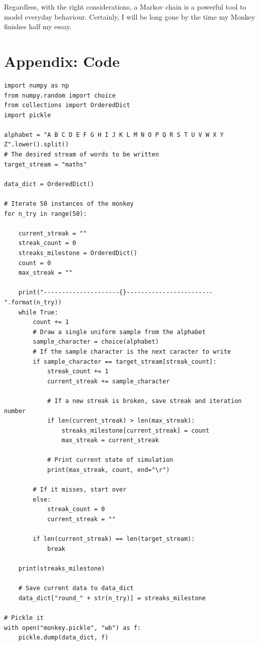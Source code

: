 \documentclass{article}
\begin{document}
Regardless, with the right considerations, a Markov chain is a powerful tool to model everyday behaviour. Certainly, I will be long gone by the time my Monkey finishes half my essay.

\newpage
\section{Appendix: Code}

\begin{Verbatim}[fontsize=\footnotesize]
import numpy as np
from numpy.random import choice
from collections import OrderedDict
import pickle

alphabet = "A B C D E F G H I J K L M N O P Q R S T U V W X Y Z".lower().split()
# The desired stream of words to be written
target_stream = "maths"

data_dict = OrderedDict()

# Iterate 50 instances of the monkey
for n_try in range(50):

    current_streak = ""
    streak_count = 0
    streaks_milestone = OrderedDict()
    count = 0
    max_streak = ""

    print("---------------------{}------------------------".format(n_try))
    while True:
        count += 1
        # Draw a single uniform sample from the alphabet
        sample_character = choice(alphabet)
        # If the sample character is the next caracter to write
        if sample_character == target_stream[streak_count]:
            streak_count += 1
            current_streak += sample_character

            # If a new streak is broken, save streak and iteration number
            if len(current_streak) > len(max_streak):
                streaks_milestone[current_streak] = count
                max_streak = current_streak

            # Print current state of simulation
            print(max_streak, count, end="\r")

        # If it misses, start over 
        else:
            streak_count = 0
            current_streak = ""

        if len(current_streak) == len(target_stream):
            break

    print(streaks_milestone)

    # Save current data to data_dict
    data_dict["round_" + str(n_try)] = streaks_milestone

# Pickle it
with open("monkey.pickle", "wb") as f:
    pickle.dump(data_dict, f)
\end{Verbatim}
\end{document}

